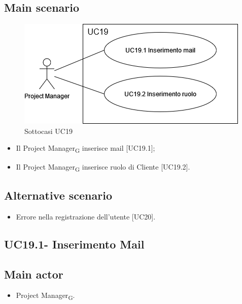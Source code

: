 \documentclass{article}
\begin{document}
    \subsection*{Main scenario}
        \begin{figure}[h]
          \centering
          \includegraphics[width=.8\textwidth, height=.6\textheight, keepaspectratio]{documenti/imgUML/UC19-zoom.drawio.png}
          \caption{Sottocasi UC19}
          \label{fig:UC19_sottocasi}
        \end{figure}
        
        \begin{itemize}
            \item Il Project Manager\textsubscript{G} inserisce mail [UC19.1];
            \item Il Project Manager\textsubscript{G} inserisce ruolo di Cliente [UC19.2].
        \end{itemize}
        
    \subsection*{Alternative scenario}
        \begin{itemize}
            \item Errore nella registrazione dell'utente [UC20].
        \end{itemize}

    \subsection{UC19.1- Inserimento Mail}
    \subsection*{Main actor}
        \begin{itemize}
            \item Project Manager\textsubscript{G}.
        \end{itemize}
        
\end{document}
